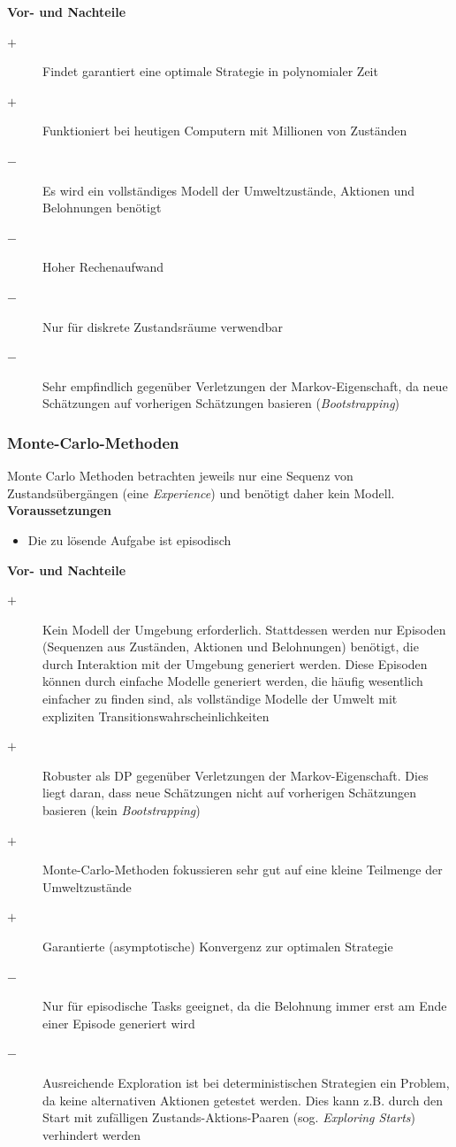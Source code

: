 \documentclass[10pt]{scrartcl}
\begin{document}
\vspace{1em}
\textbf{Vor- und Nachteile}
\begin{description}
\item[$+$] Findet garantiert eine optimale Strategie in polynomialer Zeit
\item[$+$] Funktioniert bei heutigen Computern mit Millionen von Zuständen
\item[$-$] Es wird ein vollständiges Modell der Umweltzustände, Aktionen und Belohnungen benötigt
\item[$-$] Hoher Rechenaufwand
\item[$-$] Nur für diskrete Zustandsräume verwendbar
\item[$-$] Sehr empfindlich gegenüber Verletzungen der Markov-Eigenschaft, da neue Schätzungen auf vorherigen Schätzungen basieren (\emph{Bootstrapping})
\end{description}

\subsubsection{Monte-Carlo-Methoden}
Monte Carlo Methoden betrachten jeweils nur eine Sequenz von Zustandsübergängen (eine \emph{Experience}) und benötigt daher kein Modell. \\

\textbf{Voraussetzungen}
\begin{itemize}
\item Die zu lösende Aufgabe ist episodisch
\end{itemize}

\vspace{1em}
\textbf{Vor- und Nachteile}
\begin{description}
\item[$+$] Kein Modell der Umgebung erforderlich. Stattdessen werden nur Episoden (Sequenzen aus Zuständen, Aktionen und Belohnungen) benötigt, die durch Interaktion mit der Umgebung generiert werden. Diese Episoden können durch einfache Modelle generiert werden, die häufig wesentlich einfacher zu finden sind, als vollständige Modelle der Umwelt mit expliziten Transitionswahrscheinlichkeiten
\item[$+$] Robuster als DP gegenüber Verletzungen der Markov-Eigenschaft. Dies liegt daran, dass neue Schätzungen nicht auf vorherigen Schätzungen basieren (kein \emph{Bootstrapping})
\item[$+$] Monte-Carlo-Methoden fokussieren sehr gut auf eine kleine Teilmenge der Umweltzustände
\item[$+$] Garantierte (asymptotische) Konvergenz zur optimalen Strategie
\item[$-$] Nur für episodische Tasks geeignet, da die Belohnung immer erst am Ende einer Episode generiert wird
\item[$-$] Ausreichende Exploration ist bei deterministischen Strategien ein Problem, da keine alternativen Aktionen getestet werden. Dies kann z.B. durch den Start mit zufälligen Zustands-Aktions-Paaren (sog. \emph{Exploring Starts}) verhindert werden
\end{description}
\end{document}
